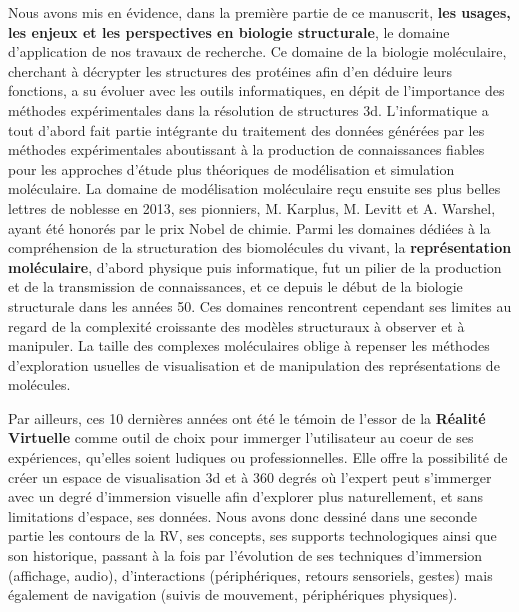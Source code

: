Nous avons mis en évidence, dans la première partie de ce manuscrit, \textbf{les usages, les enjeux et les perspectives en biologie structurale}, le domaine d'application de nos travaux de recherche. Ce domaine de la biologie moléculaire, cherchant à décrypter les structures des protéines afin d'en déduire leurs fonctions, a su évoluer avec les outils informatiques, en dépit de l'importance des méthodes expérimentales dans la résolution de structures 3d. L'informatique a tout d'abord fait partie intégrante du traitement des données générées par les méthodes expérimentales aboutissant à la production de connaissances fiables pour les approches d'étude plus théoriques de modélisation et simulation moléculaire. La domaine de modélisation moléculaire reçu ensuite ses plus belles lettres de noblesse en 2013, ses pionniers, M. Karplus, M. Levitt et A. Warshel, ayant été honorés par le prix Nobel de chimie.  Parmi les domaines dédiées à la compréhension de la structuration des biomolécules du vivant, la \textbf{représentation moléculaire}, d'abord physique puis informatique, fut un pilier de la production et de la transmission de connaissances, et ce depuis le début de la biologie structurale dans les années 50.  Ces domaines rencontrent cependant ses limites au regard de la complexité croissante des modèles structuraux à observer et à manipuler. La taille des complexes moléculaires oblige à repenser les méthodes d'exploration usuelles de visualisation et de manipulation des représentations de molécules.


Par ailleurs, ces 10 dernières années ont été le témoin de l'essor de la \textbf{Réalité Virtuelle} comme outil de choix pour immerger l'utilisateur au coeur de ses expériences, qu'elles soient ludiques ou professionnelles. Elle offre la possibilité de créer un espace de visualisation 3d et à 360 degrés où l'expert peut s'immerger avec un degré d'immersion visuelle afin d'explorer plus naturellement, et sans limitations d'espace, ses données. Nous avons donc dessiné dans une seconde partie les contours de la RV, ses concepts, ses supports technologiques ainsi que son historique, passant à la fois par l'évolution de ses techniques d'immersion (affichage, audio), d'interactions (périphériques, retours sensoriels, gestes) mais également de navigation (suivis de mouvement, périphériques physiques). 

